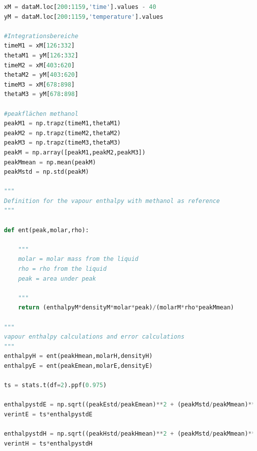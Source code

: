 \documentclass[a4paper,abstracton]{article}	                       %
\begin{document}
\begin{lstlisting}[language=Python]
xM = dataM.loc[200:1159,'time'].values - 40
yM = dataM.loc[200:1159,'temperature'].values

#Integrationsbereiche
timeM1 = xM[126:332]
thetaM1 = yM[126:332]
timeM2 = xM[403:620]
thetaM2 = yM[403:620]
timeM3 = xM[678:898]
thetaM3 = yM[678:898]

#peakflächen methanol
peakM1 = np.trapz(timeM1,thetaM1)
peakM2 = np.trapz(timeM2,thetaM2)
peakM3 = np.trapz(timeM3,thetaM3)
peakM = np.array([peakM1,peakM2,peakM3])
peakMmean = np.mean(peakM)
peakMstd = np.std(peakM)

"""
Definition for the vapour enthalpy with methanol as reference
"""

def ent(peak,molar,rho):
    
    """
    molar = molar mass from the liquid
    rho = rho from the liquid
    peak = area under peak 

    """
    return (enthalpyM*densityM*molar*peak)/(molarM*rho*peakMmean)

"""
vapour enthalpy calculations and error calculations
"""
enthalpyH = ent(peakHmean,molarH,densityH)
enthalpyE = ent(peakEmean,molarE,densityE)

ts = stats.t(df=2).ppf(0.975)

enthalpystdE = np.sqrt((peakEstd/peakEmean)**2 + (peakMstd/peakMmean)**2)*enthalpyE
verintE = ts*enthalpystdE

enthalpystdH = np.sqrt((peakHstd/peakHmean)**2 + (peakMstd/peakMmean)**2)*enthalpyH
verintH = ts*enthalpystdH


\end{lstlisting}
\end{document}
